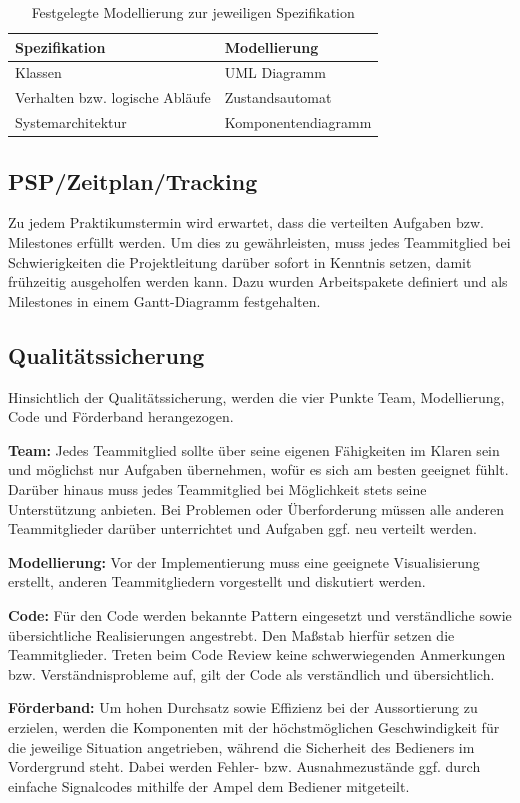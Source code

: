 \documentclass[a4paper, 11pt]{article}
\begin{document}
\begin{table}[h]
\center
\begin{tabularx}{\textwidth}{|l|X|}
\hline
\textbf{Spezifikation}&\textbf{Modellierung}\\
\hline
Klassen&UML Diagramm\\
\hline
Verhalten bzw. logische Abläufe&Zustandsautomat\\
\hline
Systemarchitektur&Komponentendiagramm\\
\hline
\end{tabularx}
\caption{Festgelegte Modellierung zur jeweiligen Spezifikation}
\label{visuals}
\end{table}

\subsection{PSP/Zeitplan/Tracking}
Zu jedem Praktikumstermin wird erwartet, dass die verteilten Aufgaben bzw. Milestones erfüllt werden. Um dies zu gewährleisten, muss jedes Teammitglied bei Schwierigkeiten die Projektleitung darüber sofort in Kenntnis setzen, damit frühzeitig ausgeholfen werden kann. Dazu wurden Arbeitspakete definiert und als Milestones in einem Gantt-Diagramm festgehalten.

\subsection{Qualitätssicherung}
Hinsichtlich der Qualitätssicherung, werden die vier Punkte Team, Modellierung, Code und Förderband herangezogen.
\medskip
\begin{compactenum}[1.]
\item \textbf{Team:} Jedes Teammitglied sollte über seine eigenen Fähigkeiten im Klaren sein und möglichst nur Aufgaben übernehmen, wofür es sich am besten geeignet fühlt. Darüber hinaus muss jedes Teammitglied bei Möglichkeit stets seine Unterstützung anbieten. Bei Problemen oder Überforderung müssen alle anderen Teammitglieder darüber unterrichtet und Aufgaben ggf. neu verteilt werden.
\medskip
\item \textbf{Modellierung:} Vor der Implementierung muss eine geeignete Visualisierung erstellt, anderen Teammitgliedern vorgestellt und diskutiert werden. 
\medskip
\item \textbf{Code:} Für den Code werden bekannte Pattern eingesetzt und verständliche sowie übersichtliche Realisierungen angestrebt. Den Maßstab hierfür setzen die Teammitglieder. Treten beim Code Review keine schwerwiegenden Anmerkungen bzw. Verständnisprobleme auf, gilt der Code als verständlich und übersichtlich.
\medskip
\item \textbf{Förderband:} Um hohen Durchsatz sowie Effizienz bei der Aussortierung zu erzielen, werden die Komponenten mit der höchstmöglichen Geschwindigkeit für die jeweilige Situation angetrieben, während die Sicherheit des Bedieners im Vordergrund steht. Dabei werden Fehler- bzw. Ausnahmezustände ggf. durch einfache Signalcodes mithilfe der Ampel dem Bediener mitgeteilt.
\end{compactenum}
\end{document}
